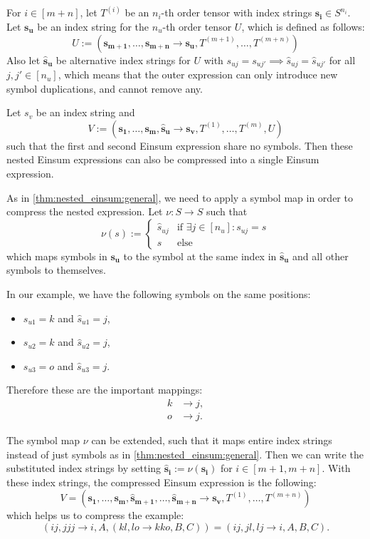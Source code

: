 \begin{theorem}
    \label{thm:nested_einsum:introduce_duplications}

    For $i \in [m + n]$, let $T^{(i)}$ be an $n_i$-th order tensor with index strings $\bm{s_i} \in S^{n_i}$.
    Let $\bm{s_u}$ be an index string for the $n_u$-th order tensor $U$, which is defined as follows:
    $$U := (\bm{s_{m + 1}},\dots,\bm{s_{m + n}} \rightarrow \bm{s_u}, T^{(m + 1)},\dots,T^{(m + n)})$$
    Also let $\bm{\hat{s}_u}$ be alternative index strings for $U$ with $s_{uj} = s_{uj'} \implies \hat{s}_{uj} = \hat{s}_{uj'}$ for all $j, j' \in [n_u]$,
    which means that the outer expression can only introduce new symbol duplications, and cannot remove any.

    Let $s_v$ be an index string and
    $$V := (\bm{s_1},\dots,\bm{s_m}, \bm{\hat{s}_u} \rightarrow \bm{s_v}, T^{(1)},\dots,T^{(m)}, U)$$
    such that the first and second Einsum expression share no symbols.
    Then these nested Einsum expressions can also be compressed into a single Einsum expression.

    As in \cref{thm:nested_einsum:general}, we need to apply a symbol map in order to compress the nested expression.
    Let $\nu: S \rightarrow S$ such that
    $$\nu(s) := \begin{cases}
            \hat{s}_{uj} & \text{if $\exists j \in [n_u]: s_{uj} = s$} \\
            s            & \text{else}
        \end{cases}$$
    which maps symbols in $\bm{s_u}$ to the symbol at the same index in $\bm{\hat{s}_u}$ and all other symbols to themselves.

    In our example, we have the following symbols on the same positions:
    \begin{itemize}
        \item $s_{u1} = k$ and $\hat{s}_{u1} = j$,
        \item $s_{u2} = k$ and $\hat{s}_{u2} = j$,
        \item $s_{u3} = o$ and $\hat{s}_{u3} = j$.
    \end{itemize}
    Therefore these are the important mappings:
    \begin{align*}
        k & \rightarrow j, \\
        o & \rightarrow j.
    \end{align*}

    The symbol map $\nu$ can be extended, such that it maps entire index strings instead of just symbols as in \cref{thm:nested_einsum:general}.
    Then we can write the substituted index strings by setting $\bm{\hat{s}_i} := \nu(\bm{s_i})$ for $i \in [m + 1, m + n]$.
    With these index strings, the compressed Einsum expression is the following:
    $$V = (\bm{s_1},\dots,\bm{s_m}, \bm{\hat{s}_{m + 1}}, \dots, \bm{\hat{s}_{m + n}} \rightarrow \bm{s_v}, T^{(1)},\dots,T^{(m + n)})$$
    which helps us to compress the example:
    $$(ij, jjj \rightarrow i, A, (kl, lo \rightarrow kko, B, C)) = (ij, jl, lj \rightarrow i, A, B, C).$$
\end{theorem}

